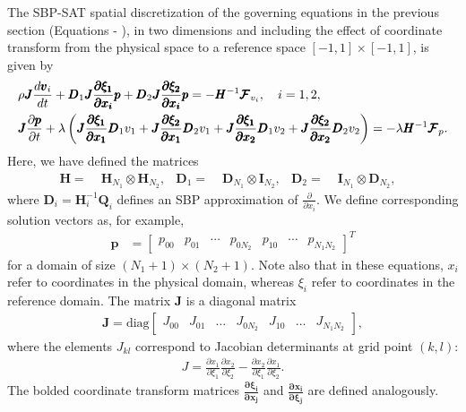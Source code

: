 The SBP-SAT spatial discretization of the governing equations in the previous section
(Equations  - ), in two dimensions and including the
effect of coordinate transform from the physical space to a reference space
$[-1,1]\times[-1,1]$, is given by
\begin{align}
	&\rho \pmb{J} \frac{d \pmb{v}_{i}}{dt}
	+ \pmb{D}_{1} \pmb{J} \frac{ \pmb{\partial \xi_{1}}}{\pmb{\partial x_{i}}} \pmb{p}
	+ \pmb{D}_{2} \pmb{J}\frac{\pmb{\partial \xi_{2}}}{\pmb{\partial x_{i}}} \pmb{p} =
	- \pmb{{H}}^{-1}\pmb{\mathcal{F}}_{v_{i}}, \quad i=1,2,\\
	&\pmb{J}\frac{\partial \pmb{p}}{\partial t} +\lambda\left(
	\pmb{J}\frac{\pmb{\partial \xi_{1}}}{\pmb{\partial x_{1}}} \pmb{D}_{1} v_{1}
	+ \pmb{J}\frac{\pmb{\partial \xi_{2}}}{\pmb{\partial x_{1}}} \pmb{D}_{2} v_{1}
	+ \pmb{J}\frac{\pmb{\partial \xi_{1}}}{\pmb{\partial x_{2}}} \pmb{D}_{1} v_{2}
	+ \pmb{J}\frac{\pmb{\partial \xi_{2}}}{\pmb{\partial x_{2}}} \pmb{D}_{2} v_{2}
  \right)
  =
	-\lambda \pmb{H}^{-1} \pmb{\mathcal{F}}_{p}.
\end{align}
Here, we have defined the matrices
\begin{align}
	\pmb{H}     =\;& \pmb{H}_{N_{1}}\otimes \pmb{H}_{N_{2}},&
	\pmb{D}_{1} =\;& \pmb{D}_{N_{1}}\otimes \pmb{I}_{N_{2}},&
	\pmb{D}_{2} =\;& \pmb{I}_{N_{1}}\otimes \pmb{D}_{N_{2}},&
\end{align}
where $\pmb{D}_{i} = \pmb{H}_{i}^{-1}\pmb{Q}_{i}$ defines an SBP approximation of $\frac{\partial}{\partial x_{i}}$.
We define corresponding solution vectors as, for example,
\begin{align}
  \pmb{p} &=
  \begin{bmatrix}
    p_{00} & p_{01} & \cdots & p_{0N_{2}} & p_{10} & \cdots & p_{N_{1}N_{2}}
  \end{bmatrix}^{T}
\end{align}
for a domain of size $(N_{1}+1) \times (N_{2}+1)$.
Note also that in these equations, $x_{i}$ refer to coordinates in the physical domain,
whereas $\xi_{i}$ refer to coordinates in the reference domain. The matrix $\pmb{J}$ is
a diagonal matrix
\begin{align}
  \pmb{J} = \text{diag}
  \begin{bmatrix}
	  J_{00} & J_{01} & \hdots & J_{0N_{2}} & J_{10} & \hdots & J_{N_{1}N_{2}} \label{eq:sbp_jac}
  \end{bmatrix},
\end{align}
where the elements $J_{kl}$ correspond to Jacobian determinants at grid point $(k,l)$:
\begin{align}
J = \frac{\partial x_{1}}{\partial \xi_{1}} \frac{\partial x_{2}}{\partial \xi_{2}} -
    \frac{\partial x_{2}}{\partial \xi_{1}} \frac{\partial x_{1}}{\partial \xi_{2}}.
\end{align}
The bolded coordinate transform matrices $\frac{\pmb{\partial \xi_{i}}}{\pmb{\partial x_{j}}}$
and $\frac{\pmb{\partial x_{i}}}{\pmb{\partial \xi_{j}}}$ are defined analogously.

